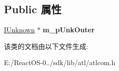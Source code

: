 \subsection*{Public 属性}
\begin{DoxyCompactItemize}
\item 
\mbox{\label{class_a_t_l_1_1_c_com_contained_object_a2fa737fe817a1f2556ef1436ca2b9682}} 
\hyperlink{interface_i_unknown}{I\+Unknown} $\ast$ {\bfseries m\+\_\+p\+Unk\+Outer}
\end{DoxyCompactItemize}


该类的文档由以下文件生成\+:\begin{DoxyCompactItemize}
\item 
E\+:/\+React\+O\+S-\/0../sdk/lib/atl/atlcom.\+h\end{DoxyCompactItemize}
